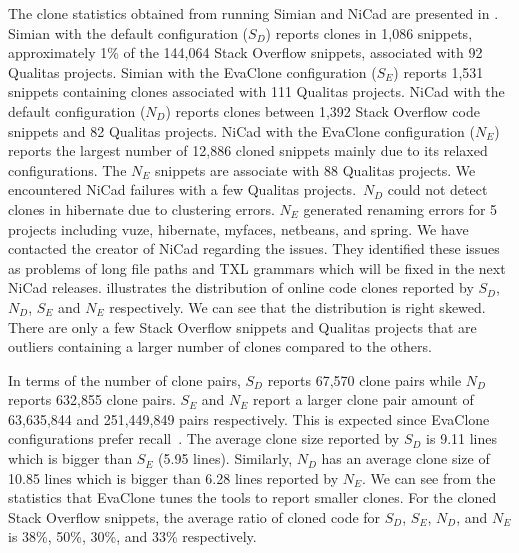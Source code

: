 \documentclass[sigconf,review, anonymous]{acmart}
\begin{document}
The clone statistics obtained from running Simian and NiCad are presented in . Simian with the default configuration ($S_D$) reports clones in 1,086 snippets, approximately 1\% of the 144,064 Stack Overflow snippets, associated with 92 Qualitas projects. Simian with the EvaClone configuration ($S_E$) reports 1,531 snippets containing clones associated with 111 Qualitas projects. NiCad with the default configuration ($N_D$) reports clones between 1,392 Stack Overflow code snippets and 82 Qualitas projects. NiCad with the EvaClone configuration ($N_E$) reports the largest number of 12,886 cloned snippets mainly due to its relaxed configurations. The $N_E$ snippets are associate with 88 Qualitas projects. We encountered NiCad failures with a few Qualitas projects.~$N_D$ could not detect clones in \textsf{hibernate} due to clustering errors. $N_E$ generated renaming errors for 5 projects including \textsf{vuze}, \textsf{hibernate}, \textsf{myfaces}, \textsf{netbeans}, and \textsf{spring}. We have contacted the creator of NiCad regarding the issues. They identified these issues as problems of long file paths and TXL grammars which will be fixed in the next NiCad releases.  illustrates the distribution of online code clones reported by $S_D$, $N_D$, $S_E$ and $N_E$ respectively. We can see that the distribution is right skewed. There are only a few Stack Overflow snippets and Qualitas projects that are outliers containing a larger number of clones compared to the others.

In terms of the number of clone pairs, $S_D$ reports 67,570 clone pairs while $N_D$ reports 632,855 clone pairs. $S_E$ and $N_E$ report a larger clone pair amount of 63,635,844 and 251,449,849 pairs respectively. This is expected since EvaClone configurations prefer recall~\cite{Wang2013}. 
The average clone size reported by $S_D$ is 9.11 lines which is bigger than $S_E$ (5.95 lines). Similarly, $N_D$ has an average clone size of 10.85 lines which is bigger than 6.28 lines reported by $N_E$. We can see from the statistics that EvaClone tunes the tools to report smaller clones. For the cloned Stack Overflow snippets, the average ratio of cloned code for $S_D$, $S_E$, $N_D$, and $N_E$ is 38\%, 50\%, 30\%, and 33\%  respectively. 
\end{document}
